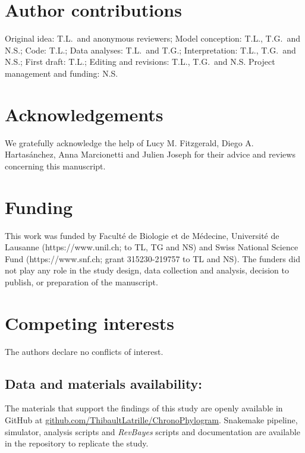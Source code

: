 \documentclass{article}
\begin{document}

\section*{Author contributions}
Original idea: T.L.\ and anonymous reviewers;
Model conception: T.L., T.G.\ and N.S.;
Code: T.L.;
Data analyses: T.L.\ and T.G.;
Interpretation: T.L., T.G.\ and N.S.;
First draft: T.L.;
Editing and revisions: T.L., T.G.\ and N.S.
Project management and funding: N.S\@.

\section*{Acknowledgements}
\label{sec:acknowledgment}
We gratefully acknowledge the help of Lucy M. Fitzgerald, Diego A. Hartasánchez, Anna Marcionetti and Julien Joseph for their advice and reviews concerning this manuscript.

\section*{Funding}
This work was funded by Faculté de Biologie et de Médecine, Université de Lausanne (https://www.unil.ch; to TL, TG and NS) and Swiss National Science Fund (https://www.snf.ch; grant 315230-219757 to TL and NS). The funders did not play any role in the study design, data collection and analysis, decision to publish, or preparation of the manuscript.

\section*{Competing interests}
The authors declare no conflicts of interest.

\subsection*{Data and materials availability:}
The materials that support the findings of this study are openly available in GitHub at \href{https://github.com/ThibaultLatrille/ChronoPhylogram}{github.com/ThibaultLatrille/ChronoPhylogram}.
Snakemake pipeline, simulator, analysis scripts and \textit{RevBayes} scripts and documentation are available in the repository to replicate the study.
\end{document}
